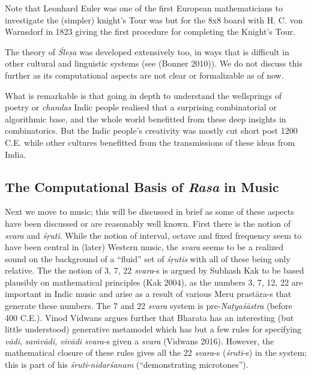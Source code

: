 Note that Leonhard Euler was one of the first European mathematicians to investigate the (simpler) knight’s Tour was but for the 8x8 board with H. C. von Warnsdorf in 1823 giving the first procedure for completing the Knight's Tour.

The theory of \textsl{Śleṣa} was developed extensively too, in ways that is difficult in other cultural and linguistic systems (see (Bonner 2010)). We do not discuss this further as its computational aspects are not clear or formalizable as of now.

What is remarkable is that going in depth to understand the wellsprings of poetry or \textsl{chandas}  Indic people realised that a surprising combinatorial or algorithmic base, and the whole world benefitted from these deep insights in combinatorics. But the Indic people’s creativity was mostly cut short post 1200 C.E. while other cultures benefitted from the transmissions of these ideas from India.

\subsection{The Computational Basis of \textsl{Rasa} in Music}\label{chap3-sec5.2}

Next we move to music; this will be discussed in brief as some of these aspects have been discussed or are reasonably well known. First there is the notion of \textsl{svara} and \textsl{śṛuti}. While the notion of interval, octave and fixed frequency seem to have been central in (later) Western music, the \textsl{svara} seems to be a realized sound on the background of a “fluid” set of \textsl{śṛutis} with all of these being only relative. The the notion of 3, 7, 22 \textsl{svara}-s is argued by Subhash Kak to be based plausibly on mathematical principles (Kak 2004), as the numbers 3, 7, 12, 22 are important in Indic music and arise as a result of various Meru prastāra-s that generate these numbers. The 7 and 22 \textsl{svara} system is pre-\textsl{Naṭyaśāstra} (before 400 C.E.). Vinod Vidwans argues further that Bharata has an interesting (but little understood) generative metamodel which has but  a few rules for specifying \textsl{vādi}, \textsl{saṁvādi, vivādi svara}-s given a \textsl{svara} (Vidwans 2016). However, the mathematical closure of these rules gives all the 22 \textsl{svara}-s (\textsl{śruti}-s) in the system; this is part of his \textsl{śruti}-\textsl{nidarśanam} (“demonstrating microtones”).

